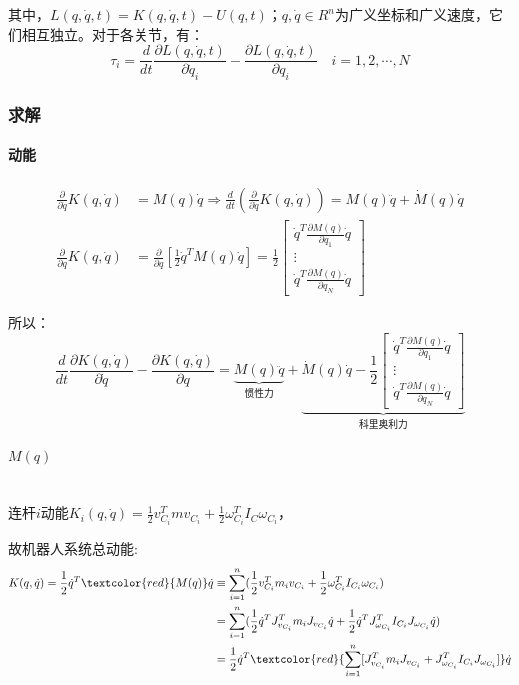 \documentclass[
12pt, %
a4paper, 
oneside, %
headinclude,footinclude, %
]{scrartcl}
\begin{document}
其中，$ L(q, \dot{q}, t) = K(q, \dot{q}, t) - U(q, t) $；$ q,\dot{q} \in R^n $为广义坐标和广义速度，它们相互独立。对于各关节，有：
$$ \tau_i = \frac{d}{d t}\frac{\partial L(q, \dot{q}, t)}{\partial \dot{q}_i} - \frac{\partial L(q, \dot{q}, t)}{\partial q_i} \quad i = 1, 2, \cdots, N $$
\subsubsection[求解]{求解}
\paragraph{动能}
\begin{align*}
\frac{\partial}{\partial\dot{q}}K(q, \dot{q}) &= M(q)\dot{q} \Rightarrow \frac{d}{d t}(\frac{\partial}{\partial\dot{q}}K(q, \dot{q})) = M(q)\ddot{q} + \dot{M}(q)\dot{q} \\
\frac{\partial}{\partial q}K(q,\dot{q}) &= \frac{\partial}{\partial q}[\frac{1}{2}\dot{q}^T M(q)\dot{q}] = \frac{1}{2} \begin{bmatrix} \dot{q}^T\frac{\partial M(q)}{\partial q_1}\dot{q} \\ \vdots \\ \dot{q}^T\frac{\partial M(q)}{\partial q_N}\dot{q} \end{bmatrix}
\end{align*}

所以：
$$ \frac{d}{dt}\frac{\partial K(q,\dot{q})}{\partial\dot{q}} - \frac{\partial K(q,\dot{q})}{\partial q} = \underbrace{M(q)\ddot{q}}_{\text{惯性力}} + \underbrace{\dot{M}(q)\dot{q} - \frac{1}{2}\begin{bmatrix} \dot{q}^T\frac{\partial M(q)}{\partial q_1}\dot{q} \\ \vdots \\ \dot{q}^T\frac{\partial M(q)}{\partial q_N}\dot{q} \end{bmatrix}}_{\text{科里奥利力}} $$
\paragraph{$ M(q) $}\label{sec:bingxing_back2}~\\

连杆$ i $动能$ K_i(q, \dot{q}) = \frac{1}{2}v_{C_i}^T mv_{C_i} + \frac{1}{2}\omega_{C_i}^T I_C\omega_{C_i} $，

故机器人系统总动能:
\begin{align*}
K(q, \dot{q}) = \frac{1}{2}\dot{q}^T \textcolor{red}{M(q)} \dot{q} &\equiv \sum_{i=1}^{n}(\frac{1}{2}v_{C_i}^T m_i v_{C_i} + \frac{1}{2}\omega_{C_i}^T I_{C_i}\omega_{C_i}) \\
&= \sum_{i = 1}^{n}(\frac{1}{2}\dot{q}^T J_{v_{C_i}}^T m_i J_{v_{C_i}} \dot{q} + \frac{1}{2}\dot{q}^T J_{\omega_{C_i}}^T I_{C_i} J_{\omega_{C_i}} \dot{q}) \\
&= \frac{1}{2}\dot{q}^T \textcolor{red}{\sum_{i = 1}^{n}[J_{v_{C_i}}^T m_i J_{v_{C_i}} + J_{\omega_{C_i}}^T I_{C_i} J_{\omega_{C_i}}]} \dot{q}
\end{align*}
\end{document}
